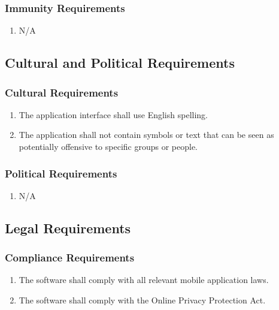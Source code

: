\documentclass[]{article}
\begin{document}
\subsubsection{Immunity Requirements}
\label{ssub:immunity_requirements}
\begin{enumerate}[{SR}1. ]
	\item N/A
\end{enumerate}


\subsection{Cultural and Political Requirements}
\label{sub:cultural_and_political_requirements}

\subsubsection{Cultural Requirements}
\label{ssub:cultural_requirements}
\begin{enumerate}[{CP}1. ]
	\item The application interface shall use English spelling.
	\item The application shall not contain symbols or text that can be seen as potentially offensive to specific groups or people.
\end{enumerate}

\subsubsection{Political Requirements}
\label{ssub:political_requirements}
\begin{enumerate}[{CP}1. ]
	\item N/A
\end{enumerate}


\subsection{Legal Requirements}
\label{sub:legal_requirements}

\subsubsection{Compliance Requirements}
\label{ssub:compliance_requirements}
\begin{enumerate}[{LR}1. ]
	\item The software shall comply with all relevant mobile application laws.
	\item The software shall comply with the Online Privacy Protection Act.
\end{enumerate}
\end{document}
